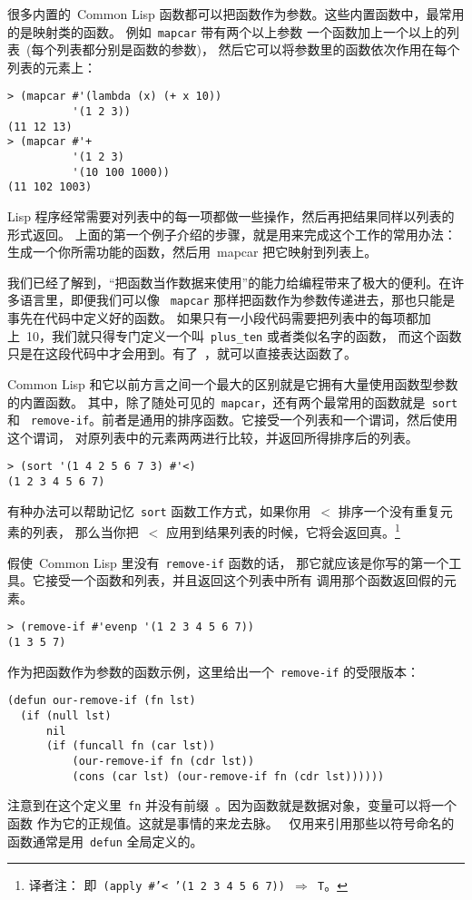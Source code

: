 很多内置的~Common Lisp 函数都可以把函数作为参数。这些内置函数中，最常用的是映射类的函数。
例如~\texttt{mapcar}
带有两个以上参数\pozhehao{} 一个函数加上一个以上的列表~(每个列表都分别是函数的参数)，
然后它可以将参数里的函数依次作用在每个列表的元素上：
\begin{lstlisting}
> (mapcar #'(lambda (x) (+ x 10))
          '(1 2 3))
(11 12 13)
> (mapcar #'+
          '(1 2 3)
          '(10 100 1000))
(11 102 1003)
\end{lstlisting}
Lisp 程序经常需要对列表中的每一项都做一些操作，然后再把结果同样以列表的形式返回。
上面的第一个例子介绍的步骤，就是用来完成这个工作的常用办法：生成一个你所需功能的函数，然后用~mapcar
把它映射到列表上。

我们已经了解到，``把函数当作数据来使用''的能力给编程带来了极大的便利。在许多语言里，即便我们可以像
~\texttt{mapcar} 那样把函数作为参数传递进去，那也只能是事先在代码中定义好的函数。
如果只有一小段代码需要把列表中的每项都加上~10，我们就只得专门定义一个叫~\verb|plus_ten| 或者类似名字的函数，
而这个函数只是在这段代码中才会用到。有了~\lexpr，就可以直接表达函数了。

Common Lisp 和它以前方言之间一个最大的区别就是它拥有大量使用函数型参数的内置函数。
其中，除了随处可见的~\texttt{mapcar}，还有两个最常用的函数就是~\texttt{sort} 和
~\texttt{remove-if}。前者是通用的排序函数。它接受一个列表和一个谓词，然后使用这个谓词，
对原列表中的元素两两进行比较，并返回所得排序后的列表。
\begin{lstlisting}
> (sort '(1 4 2 5 6 7 3) #'<)
(1 2 3 4 5 6 7)
\end{lstlisting}
有种办法可以帮助记忆~\texttt{sort} 函数工作方式，如果你用~$<$ 排序一个没有重复元素的列表，
那么当你把~$<$ 应用到结果列表的时候，它将会返回真。\footnote{译者注：
  即~\texttt{(apply \#'< '(1 2 3 4 5 6 7)) $\Rightarrow$ T}。}

假使~Common Lisp 里没有~\verb|remove-if| 函数的话，
那它就应该是你写的第一个工具。它接受一个函数和列表，并且返回这个列表中所有
调用那个函数返回假的元素。
\begin{lstlisting}
> (remove-if #'evenp '(1 2 3 4 5 6 7))
(1 3 5 7)
\end{lstlisting}

作为把函数作为参数的函数示例，这里给出一个~\texttt{remove-if} 的受限版本：
\begin{lstlisting}
(defun our-remove-if (fn lst)
  (if (null lst)
      nil
      (if (funcall fn (car lst))
          (our-remove-if fn (cdr lst))
          (cons (car lst) (our-remove-if fn (cdr lst))))))
\end{lstlisting}
注意到在这个定义里~\texttt{fn} 并没有前缀~\sq。因为函数就是数据对象，变量可以将一个函数
作为它的正规值。这就是事情的来龙去脉。
\sq~仅用来引用那些以符号命名的函数\pozhehao{}通常是用~\texttt{defun} 全局定义的。


